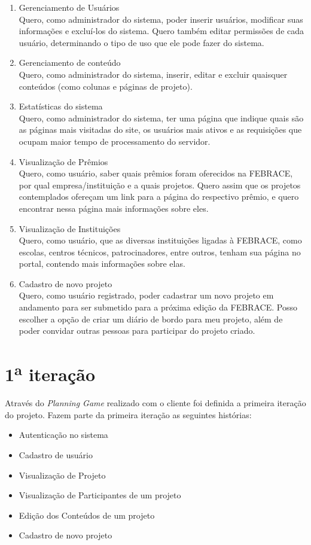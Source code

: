 \documentclass[a4paper,12pt,font=plain,header=plain]{abnt}
\begin{document}
\begin{enumerate}
	 \item Gerenciamento de Usuários \\
		Quero, como administrador do sistema, poder inserir usuários, modificar suas informações e excluí-los do sistema. Quero também editar permissões de cada usuário, determinando o tipo de uso que ele pode fazer do sistema.
	 \item Gerenciamento de conteúdo \\
		Quero, como administrador do sistema, inserir, editar e excluir quaisquer conteúdos (como colunas e páginas de projeto).
	 \item Estatísticas do sistema \\
		Quero, como administrador do sistema, ter uma página que indique quais são as páginas mais visitadas do site, os usuários mais ativos e as requisições que ocupam maior tempo de processamento do servidor.
	 \item Visualização de Prêmios \\
		Quero, como usuário, saber quais prêmios foram oferecidos na FEBRACE, por qual empresa/instituição e a quais projetos. Quero assim que os projetos contemplados ofereçam um link para a página do respectivo prêmio, e quero encontrar nessa página mais informações sobre eles.
	 \item Visualização de Instituições \\
		Quero, como usuário, que as diversas instituições ligadas à FEBRACE, como escolas, centros técnicos, patrocinadores, entre outros, tenham sua página no portal, contendo mais informações sobre elas.
	 \item Cadastro de novo projeto \\
		Quero, como usuário registrado, poder cadastrar um novo projeto em andamento para ser submetido para a próxima edição da FEBRACE. Posso escolher a opção de criar um diário de bordo para meu projeto, além de poder convidar outras pessoas para participar do projeto criado.
	\end{enumerate}

  \section{1\textsuperscript{a} iteração}

  Através do \textit{Planning Game} realizado com o cliente foi definida a primeira iteração do projeto. Fazem parte da primeira iteração as seguintes histórias:

  \begin{itemize}
    \item Autenticação no sistema
    \item Cadastro de usuário
    \item Visualização de Projeto
    \item Visualização de Participantes de um projeto
    \item Edição dos Conteúdos de um projeto
    \item Cadastro de novo projeto
  \end{itemize}
\end{document}
